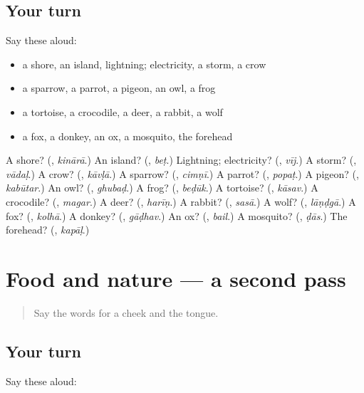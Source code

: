 \subsection*{Your turn}
Say these aloud:

\begin{itemize}
\raggedright
  \item a shore, an island, lightning; electricity, a storm, a crow
  \item a sparrow, a parrot, a pigeon, an owl, a frog
  \item a tortoise, a crocodile, a deer, a rabbit, a wolf
  \item a fox, a donkey, an ox, a mosquito, the forehead
\end{itemize}

\begin{tcolorbox}[breakable,colback=teal!4,colframe=teal!35!black,title={Before you move on}]
A shore? (\textbf{}, \emph{kinārā}.) An island? (\textbf{}, \emph{beṭ}.) Lightning; electricity? (\textbf{}, \emph{vīj}.) A storm? (\textbf{}, \emph{vādaḷ}.) A crow? (\textbf{}, \emph{kāvḷā}.) A sparrow? (\textbf{}, \emph{cimṇī}.) A parrot? (\textbf{}, \emph{popaṭ}.) A pigeon? (\textbf{}, \emph{kabūtar}.) An owl? (\textbf{}, \emph{ghubaḍ}.) A frog? (\textbf{}, \emph{beḍūk}.) A tortoise? (\textbf{}, \emph{kāsav}.) A crocodile? (\textbf{}, \emph{magar}.) A deer? (\textbf{}, \emph{harīṇ}.) A rabbit? (\textbf{}, \emph{sasā}.) A wolf? (\textbf{}, \emph{lāṇḍgā}.) A fox? (\textbf{}, \emph{kolhā}.) A donkey? (\textbf{}, \emph{gāḍhav}.) An ox? (\textbf{}, \emph{bail}.) A mosquito? (\textbf{}, \emph{ḍās}.) The forehead? (\textbf{}, \emph{kapāḷ}.)
\end{tcolorbox}
\section[(dialogue)]{Food and nature — a second pass}

\label{lesson:MR-R149-second-pass-food-and-nature}



\begin{quote}
Say the words for a cheek and the tongue.
\end{quote}

\subsection*{Your turn}
Say these aloud:

